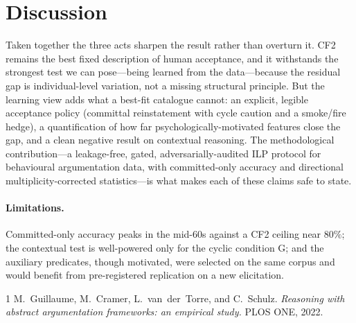 \documentclass[11pt]{article}
\begin{document}
\section{Discussion}
\label{sec:disc}

Taken together the three acts sharpen the \citet{guillaume2022} result rather than overturn it.
CF2 remains the best fixed description of human acceptance, and it withstands the strongest test we
can pose---being learned from the data---because the residual gap is individual-level variation, not
a missing structural principle. But the learning view adds what a best-fit catalogue cannot: an
explicit, legible acceptance policy (committal reinstatement with cycle caution and a smoke/fire
hedge), a quantification of how far psychologically-motivated features close the gap, and a clean
negative result on contextual reasoning. The methodological contribution---a leakage-free,
gated, adversarially-audited ILP protocol for behavioural argumentation data, with committed-only
accuracy and directional multiplicity-corrected statistics---is what makes each of these claims
safe to state.

\paragraph{Limitations.} Committed-only accuracy peaks in the mid-$60$s against a CF2 ceiling near
$80\%$; the contextual test is well-powered only for the cyclic condition G; and the auxiliary
predicates, though motivated, were selected on the same corpus and would benefit from
pre-registered replication on a new elicitation.

{\small
\begin{thebibliography}{1}
 M.~Guillaume, M.~Cramer, L.~van~der~Torre, and
C.~Schulz. \emph{Reasoning with abstract argumentation frameworks: an empirical study.} PLOS ONE,
2022.
\end{thebibliography}
}
\end{document}
